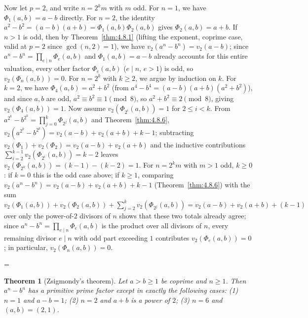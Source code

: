 \documentclass[11pt]{article}
\makeatletter
\theoremstyle{ntstyle}
\newtheorem{theorem}{Theorem}[subsection]
\let\nt@closedisplay\]
\def\nt@guardedclose{\@ifnextchar\par{\nt@closeafterpar}{\@ifnextchar\end{\postdisplaypenalty\@M\nt@closedisplay}{\nt@closedisplay}}}
\def\nt@closeafterpar\par{\@ifnextchar\par{\nt@closeafterpar}{\@ifnextchar\end{\postdisplaypenalty\@M\nt@closedisplay\par}{\nt@closedisplay\par}}}
\renewenvironment{proof}[1][\proofname]{\par
  \pushQED{\qed}\normalfont\topsep\medskipamount\edef\nt@afterproof{\@endparpenalty=\the\@endparpenalty\relax}\@beginparpenalty\@M\@endparpenalty\@M\let\]\nt@guardedclose\trivlist\item[]\textit{#1\@addpunct{.}} \ignorespaces}{\ifvmode\addpenalty\@M\fi\popQED\nt@afterproof\endtrivlist\@endpefalse}
\makeatother
\begin{document}
\begin{proof}
	Now let $p=2$, and write $n=2^km$ with $m$ odd.
	For $n=1$, we have $\Phi_1(a,b)=a-b$ directly. For $n=2$, the identity
	$a^{2}-b^{2}=(a-b)(a+b)=\Phi_1(a,b)\Phi_2(a,b)$ gives $\Phi_2(a,b)=a+b$.
	If $n>1$ is odd, then by Theorem~\ref{thm:4.8.1} (lifting the exponent, coprime case, valid at $p=2$
	since $\gcd(n, 2)=1$), we have $v_2(a^{n}-b^{n})=v_2(a-b)$; since
	$a^{n}-b^{n}=\prod_{e\mid n}\Phi_e(a,b)$ and $\Phi_1(a,b)=a-b$
	already accounts for this entire valuation, every other factor
	$\Phi_e(a,b)$ ($e\mid n$, $e>1$) is odd, so $v_2(\Phi_n(a,b))=0$. For
	$n=2^k$ with $k\ge2$, we argue by induction on $k$. For $k=2$,
	we have $\Phi_4(a,b)=a^{2}+b^{2}$ (from
	$a^{4}-b^{4}=(a-b)(a+b)(a^{2}+b^{2})$), and since $a,b$ are odd,
	$a^{2}\equiv b^{2}\equiv1\pmod{8}$, so $a^{2}+b^{2}\equiv2\pmod{8}$,
	giving $v_2(\Phi_4(a,b))=1$. Now assume
	$v_2(\Phi_{2^{i}}(a,b))=1$ for $2\le i<k$. From
	$a^{2^{k}}-b^{2^{k}}=\prod_{j=0}^{k}\Phi_{2^{j}}(a,b)$ and Theorem~\ref{thm:4.8.6}, $v_2(a^{2^{k}}-b^{2^{k}})=v_2(a-b)+v_2(a+b)+k-1$; subtracting
	$v_2(\Phi_1)+v_2(\Phi_2)=v_2(a-b)+v_2(a+b)$ and the inductive
	contributions $\sum_{i=2}^{k-1}v_2(\Phi_{2^{i}}(a,b))=k-2$ leaves
	$v_2(\Phi_{2^{k}}(a,b))=(k-1)-(k-2)=1$. For $n=2^{k}m$ with $m>1$
	odd, $k\ge0$: if $k=0$ this is the odd case above; if $k\ge1$,
	comparing $v_2(a^{n}-b^{n})=v_2(a-b)+v_2(a+b)+k-1$ (Theorem~\ref{thm:4.8.6})
	with the sum
	$v_2(\Phi_1(a,b))+v_2(\Phi_2(a,b))+\sum_{j=2}^{k}v_2(\Phi_{2^{j}}(a,b))=v_2(a-b)+v_2(a+b)+(k-1)$
	over only the power-of-$2$ divisors of $n$ shows that these two totals
	already agree; since $a^{n}-b^{n}=\prod_{e\mid n}\Phi_e(a,b)$ is the
	product over all divisors of $n$, every remaining divisor $e\mid n$
	with odd part exceeding $1$ contributes $v_2(\Phi_e(a,b))=0$; in
	particular, $v_2(\Phi_n(a,b))=0$.

\end{proof}
\begin{theorem}[Zsigmondy's theorem]\label{thm:6.11.9} Let $a > b \ge 1$ be
	coprime and $n \ge 1$. Then $a^{n} - b^{n}$ has a primitive prime
	factor except in exactly the following cases: (1) $n = 1$ and $a - b = 1$; (2) $n = 2$
	and $a + b$ is a power of $2$; (3) $n = 6$ and $(a, b) = (2, 1)$.

\end{theorem}
\end{document}
